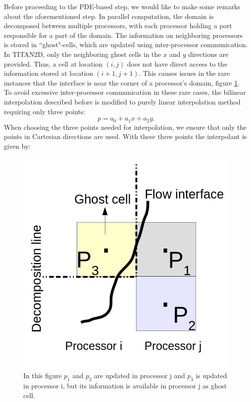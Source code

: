 \documentclass[review]{elsarticle}
\begin{document}
Before proceeding to the PDE-based step, we would like to make some remarks about the aforementioned step. 
In parallel computation, the domain is decomposed between multiple processors, with each processor holding a port responsible for a part of the domain. 
The information on neighboring processors is stored in ``ghost"-cells, which are updated using inter-processor communication. In TITAN2D, only the neighboring ghost
cells in the $x$ and $y$ directions are provided. Thus, a cell at location $(i,j)$ does not have direct access to the information stored at location $(i+1, j+1)$. 
This causes issues in the rare instances that the interface is near the corner of a processor's domain, figure \ref{fig:surf_interp}. To avoid 
excessive inter-processor communication in these rare cases, the bilinear interpolation described before is modified to purely linear interpolation method requiring 
only three points:
\begin{equation}
\label{Surface}
p=a_0+a_1 x+a_2 y.
\end{equation} 
When choosing the three points needed for interpolation, we ensure that only the points in Cartesian directions are used.
With these three points the interpolant is given by:
\begin{figure}[ht]
\centering
\includegraphics[scale=.25]{IMAGES/surf_interp.png}
\caption{In this figure $p_1$ and $p_2$ are updated in processor j and $p_3$ is updated in processor i, but its information is available in processor j as ghost cell. }
                \label{fig:surf_interp}
\end{figure}
\end{document}
